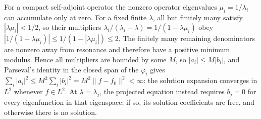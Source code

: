 For a compact self-adjoint operator the nonzero operator eigenvalues
$\mu_i=1/\lambda_i$ can accumulate only at zero. For a fixed finite
$\lambda$, all but finitely many satisfy $|\lambda\mu_i|<1/2$,
so their multipliers
$\lambda_i/(\lambda_i-\lambda)=1/(1-\lambda\mu_i)$ obey
$|1/(1-\lambda\mu_i)|\le1/(1-|\lambda\mu_i|)\le2$.
The finitely many remaining denominators are nonzero away from
resonance and therefore have a positive minimum modulus. Hence all
multipliers are bounded by some $M$, so $|a_i|\le M|b_i|$, and
Parseval's identity in the closed span of the $\varphi_i$ gives
$\sum_i|a_i|^2\le M^2\sum_i|b_i|^2=M^2\|f-f_0\|^2<\infty$: the
solution expansion converges in $L^2$ whenever $f\in L^2$.
At $\lambda=\lambda_j$, the projected equation instead requires
$b_j=0$ for every eigenfunction in that eigenspace; if so, its
solution coefficients are free, and otherwise there is no solution.
